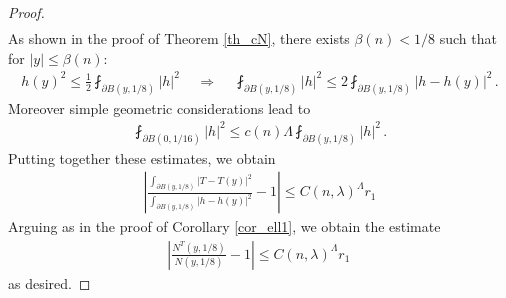 \documentclass[11pt]{article}
\begin{document}
\begin{proof}
\begin{gather}
\end{gather}
As shown in the proof of Theorem \ref{th_cN}, there exists $\beta(n)<1/8$ such that for ${\left|y\right|}\leq \beta(n)$:
\begin{gather}
 h(y)^2\leq \frac 1 2 \fint_{\partial B(y,1/8)} {\left|{h}\right|}^2 \, \quad \Longrightarrow \quad \, \fint_{\partial B(y,1/8)} {\left|{h}\right|}^2 \leq 2\fint_{\partial B(y,1/8)} {\left|{h-h(y)}\right|}^2 \, .
\end{gather}
Moreover simple geometric considerations lead to
\begin{gather}
 \fint_{\partial B(0,1/16)} {\left|h\right|} ^2 \leq c(n)\Lambda \fint_{\partial B(y,1/8)} {\left|{h}\right|}^2 \, .
\end{gather}
Putting together these estimates, we obtain
\begin{gather}
 {\left|{\frac{\int_{\partial B(y,1/8)} {\left|{T-T(y)}\right|}^2  }{\int_{\partial B(y,1/8)} {\left|{h-h(y)}\right|}^2 }  -1}\right|}\leq C(n,\lambda)^\Lambda r_1
\end{gather}
Arguing as in the proof of Corollary \ref{cor_ell1}, we obtain the estimate
\begin{gather}
 {\left|{\frac{N^T(y,1/8) }{N(y,1/8)} -1}\right|}\leq C(n,\lambda)^\Lambda r_1\, 
\end{gather}
as desired.
\end{proof}
\end{document}
